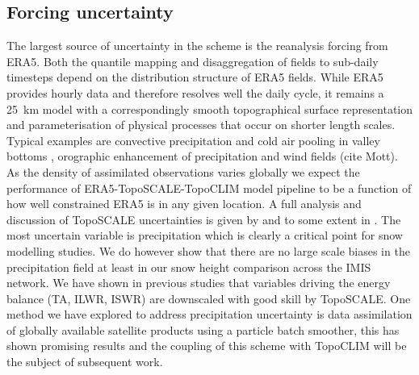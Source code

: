 \documentclass[hess, manuscript]{copernicus}
\begin{document}



\subsection{Forcing uncertainty}
The largest source of uncertainty in the scheme is the reanalysis forcing from ERA5. Both the quantile mapping and disaggregation of fields to sub-daily timesteps depend on the distribution structure of ERA5 fields. While ERA5 provides hourly data and therefore resolves well the daily cycle, it remains a 25~km model with a correspondingly smooth topographical surface representation and parameterisation of physical processes that occur on shorter length scales. Typical examples are convective precipitation and cold air pooling in valley bottoms \citep{Cao2017-ce}, orographic enhancement of precipitation and wind fields (cite Mott). As the density of assimilated observations varies globally we expect the performance of ERA5-TopoSCALE-TopoCLIM model pipeline to be a function of how well constrained ERA5 is in any given location. A full analysis and discussion of TopoSCALE uncertainties is given by \cite{Fiddes2014-wt} and to some extent in \cite{Fiddes2019-vy}. The most uncertain variable is precipitation which is clearly a critical point for snow modelling studies. We do however show that there are no large scale biases in the precipitation field at least in our snow height comparison across the IMIS network.  We have shown in previous studies that variables driving the energy balance (TA, ILWR, ISWR) are downscaled with good skill by TopoSCALE. One method we have explored to address precipitation uncertainty is data assimilation of globally available satellite products using a particle batch smoother, this has shown promising results \citep{Fiddes2019-vy} and the coupling of this scheme with TopoCLIM will be the subject of subsequent work.
\end{document}
